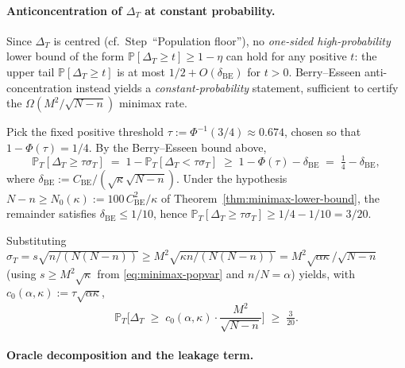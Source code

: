 \documentclass[11pt,a4paper]{article}
\theoremstyle{plain}
\theoremstyle{definition}
\theoremstyle{remark}
\newcommand{\PR}{\mathbb{P}}
\begin{document}
\paragraph{Anticoncentration of $\Delta_T$ at constant probability.}

Since $\Delta_T$ is centred (cf.\ Step~``Population floor''), no
\emph{one-sided high-probability} lower bound of the form
$\PR[\Delta_T \ge t] \ge 1 - \eta$ can hold for any positive $t$:
the upper tail $\PR[\Delta_T \ge t]$ is at most $1/2 + O(\delta_{\mathrm{BE}})$
for $t > 0$.  Berry--Esseen anti-concentration instead yields a
\emph{constant-probability} statement, sufficient to certify the
$\Omega(M^2/\sqrt{N-n})$ minimax rate.

Pick the fixed positive threshold $\tau := \Phi^{-1}(3/4) \approx
0.674$, chosen so that $1 - \Phi(\tau) = 1/4$.  By the Berry--Esseen
bound above,
\[
    \PR_T[\Delta_T \ge \tau\sigma_T]
    \;=\; 1 - \PR_T[\Delta_T < \tau\sigma_T]
    \;\ge\; 1 - \Phi(\tau) - \delta_{\mathrm{BE}}
    \;=\; \tfrac{1}{4} - \delta_{\mathrm{BE}},
\]
where $\delta_{\mathrm{BE}} := C_{\mathrm{BE}}/(\sqrt\kappa\sqrt{N-n})$.
Under the hypothesis $N - n \ge N_0(\kappa) := 100\,C_{\mathrm{BE}}^2/\kappa$
of Theorem~\ref{thm:minimax-lower-bound}, the remainder satisfies
$\delta_{\mathrm{BE}} \le 1/10$, hence $\PR_T[\Delta_T \ge \tau\sigma_T]
\ge 1/4 - 1/10 = 3/20$.

Substituting $\sigma_T = s\sqrt{n/(N(N-n))} \ge M^2\sqrt{\kappa
n/(N(N-n))} = M^2\sqrt{\alpha\kappa}/\sqrt{N-n}$ (using $s \ge
M^2\sqrt{\kappa}$ from \eqref{eq:minimax-popvar} and $n/N = \alpha$)
yields, with $c_0(\alpha, \kappa) := \tau \sqrt{\alpha\kappa}$,
\begin{equation}
    \PR_T\!\Bigg[\Delta_T \;\ge\; c_0(\alpha, \kappa)
        \cdot \frac{M^2}{\sqrt{N - n}}\Bigg]
    \;\ge\; \tfrac{3}{20}.
    \label{eq:minimax-be-prob}
\end{equation}

\paragraph{Oracle decomposition and the leakage term.}
\end{document}
